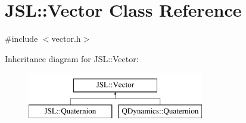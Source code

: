 \hypertarget{classJSL_1_1Vector}{}\section{J\+SL\+:\+:Vector Class Reference}
\label{classJSL_1_1Vector}


{\ttfamily \#include $<$vector.\+h$>$}

Inheritance diagram for J\+SL\+:\+:Vector\+:\begin{figure}[H]
\begin{center}
\leavevmode
\includegraphics[height=2.000000cm]{classJSL_1_1Vector}
\end{center}
\end{figure}

